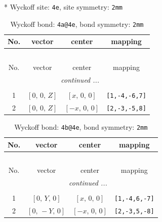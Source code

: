 \documentclass[fleqn,8pt]{jsarticle}
\begin{document}
* Wyckoff site: {\tt 4e}, site symmetry: {\tt 2mm}
\renewcommand{\arraystretch}{1.2}
\begin{longtable}{cccc}
\caption{Wyckoff bond: {\tt 4a@4e}, bond symmetry: {\tt 2mm}}
 \\
 \hline \hline
No. & vector & center & mapping \\ \hline \endfirsthead

\multicolumn{3}{l}{\tablename\ \thetable{}} \\
 \hline \hline
No. & vector & center & mapping \\ \hline \endhead

 \hline \hline
\multicolumn{3}{r}{\footnotesize\it continued ...} \\ \endfoot

 \hline \hline
\multicolumn{3}{r}{} \\ \endlastfoot

1 & $\left[ 0,\, 0,\, Z \right]$ & $\left[ x,\, 0,\, 0 \right]$ & {\tt [1,-4,-6,7]} \\ \hline
2 & $\left[ 0,\, 0,\, Z \right]$ & $\left[ - x,\, 0,\, 0 \right]$ & {\tt [2,-3,-5,8]} \\
\end{longtable}
\renewcommand{\arraystretch}{1.2}
\begin{longtable}{cccc}
\caption{Wyckoff bond: {\tt 4b@4e}, bond symmetry: {\tt 2mm}}
 \\
 \hline \hline
No. & vector & center & mapping \\ \hline \endfirsthead

\multicolumn{3}{l}{\tablename\ \thetable{}} \\
 \hline \hline
No. & vector & center & mapping \\ \hline \endhead

 \hline \hline
\multicolumn{3}{r}{\footnotesize\it continued ...} \\ \endfoot

 \hline \hline
\multicolumn{3}{r}{} \\ \endlastfoot

1 & $\left[ 0,\, Y,\, 0 \right]$ & $\left[ x,\, 0,\, 0 \right]$ & {\tt [1,-4,6,-7]} \\ \hline
2 & $\left[ 0,\, - Y,\, 0 \right]$ & $\left[ - x,\, 0,\, 0 \right]$ & {\tt [2,-3,5,-8]} \\
\end{longtable}
\renewcommand{\arraystretch}{1.2}
\end{document}
